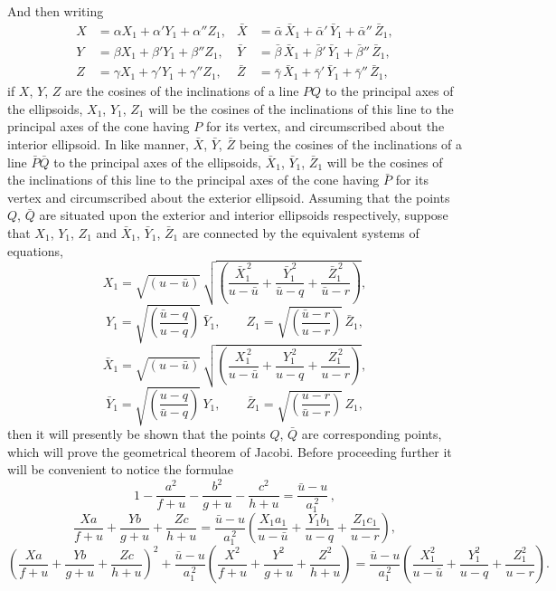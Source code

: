 \documentclass[11pt]{article}
\begin{document}
\noindent And then writing
\[
\begin{aligned}
X &= \alpha X_{1} + \alpha' Y_{1} + \alpha'' Z_{1}, & \bar{X} &= \bar{\alpha}\,\bar{X}_{1} + \bar{\alpha}'\,\bar{Y}_{1} + \bar{\alpha}''\,\bar{Z}_{1},\\
Y &= \beta X_{1} + \beta' Y_{1} + \beta'' Z_{1}, & \bar{Y} &= \bar{\beta}\,\bar{X}_{1} + \bar{\beta}'\,\bar{Y}_{1} + \bar{\beta}''\,\bar{Z}_{1},\\
Z &= \gamma X_{1} + \gamma' Y_{1} + \gamma'' Z_{1}, & \bar{Z} &= \bar{\gamma}\,\bar{X}_{1} + \bar{\gamma}'\,\bar{Y}_{1} + \bar{\gamma}''\,\bar{Z}_{1},
\end{aligned}
\]
if $X$, $Y$, $Z$ are the cosines of the inclinations of a line $PQ$ to the principal axes of the ellipsoids, $X_{1}$, $Y_{1}$, $Z_{1}$ will be the cosines of the inclinations of this line to the principal axes of the cone having $P$ for its vertex, and circumscribed about the interior ellipsoid. In like manner, $\bar{X}$, $\bar{Y}$, $\bar{Z}$ being the cosines of the inclinations of a line $\bar{P}\bar{Q}$ to the principal axes of the ellipsoids, $\bar{X}_{1}$, $\bar{Y}_{1}$, $\bar{Z}_{1}$ will be the cosines of the inclinations of this line to the principal axes of the cone having $\bar{P}$ for its vertex and circumscribed about the exterior ellipsoid. Assuming that the points $Q$, $\bar{Q}$ are situated upon the exterior and interior ellipsoids respectively, suppose that $X_{1}$, $Y_{1}$, $Z_{1}$ and $\bar{X}_{1}$, $\bar{Y}_{1}$, $\bar{Z}_{1}$ are connected by the equivalent systems of equations,
\[
X_{1} = \sqrt{(u - \bar{u})}\,\sqrt{\!\left(\frac{\bar{X}_{1}^{\,2}}{u - \bar{u}} + \frac{\bar{Y}_{1}^{\,2}}{\bar{u} - q} + \frac{\bar{Z}_{1}^{\,2}}{\bar{u} - r}\right)},
\]
\[
Y_{1} = \sqrt{\!\left(\frac{\bar{u} - q}{u - q}\right)}\,\bar{Y}_{1},\qquad Z_{1} = \sqrt{\!\left(\frac{\bar{u} - r}{u - r}\right)}\,\bar{Z}_{1},
\]
\[
\bar{X}_{1} = \sqrt{(u - \bar{u})}\,\sqrt{\!\left(\frac{X_{1}^{\,2}}{u - \bar{u}} + \frac{Y_{1}^{\,2}}{u - q} + \frac{Z_{1}^{\,2}}{u - r}\right)},
\]
\[
\bar{Y}_{1} = \sqrt{\!\left(\frac{u - q}{\bar{u} - q}\right)}\,Y_{1},\qquad \bar{Z}_{1} = \sqrt{\!\left(\frac{u - r}{\bar{u} - r}\right)}\,Z_{1},
\]
then it will presently be shown that the points $Q$, $\bar{Q}$ are corresponding points, which will prove the geometrical theorem of Jacobi. Before proceeding further it will be convenient to notice the formulae
\[
1 - \frac{a^{2}}{f + u} - \frac{b^{2}}{g + u} - \frac{c^{2}}{h + u} = \frac{\bar{u} - u}{a_{1}^{\,2}}\,,
\]
\[
\frac{Xa}{f + u} + \frac{Yb}{g + u} + \frac{Zc}{h + u} = \frac{\bar{u} - u}{a_{1}^{\,2}}\!\left(\frac{X_{1} a_{1}}{u - \bar{u}} + \frac{Y_{1} b_{1}}{u - q} + \frac{Z_{1} c_{1}}{u - r}\right),
\]
\[
\left(\frac{Xa}{f + u} + \frac{Yb}{g + u} + \frac{Zc}{h + u}\right)^{\!2} + \frac{\bar{u} - u}{a_{1}^{\,2}}\!\left(\frac{X^{2}}{f + u} + \frac{Y^{2}}{g + u} + \frac{Z^{2}}{h + u}\right) = \frac{\bar{u} - u}{a_{1}^{\,2}}\!\left(\frac{X_{1}^{2}}{u - \bar{u}} + \frac{Y_{1}^{2}}{u - q} + \frac{Z_{1}^{2}}{u - r}\right).
\]
\end{document}

